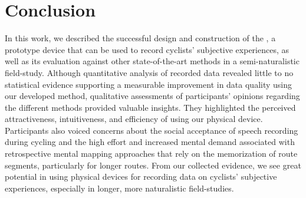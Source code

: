 \section{Conclusion}\label{sec:conclusion}

In this work, we described the successful design and construction of the \likertshift, a prototype device that can be used to record cyclists' subjective experiences, as well as its evaluation against other state-of-the-art methods in a semi-naturalistic field-study.
Although quantitative analysis of recorded data revealed little to no statistical evidence supporting a measurable improvement in data quality using our developed \likertshift method, qualitative assessments of participants' opinions regarding the different methods provided valuable insights.
They highlighted the perceived attractiveness, intuitiveness, and efficiency of using our physical device.
Participants also voiced concerns about the social acceptance of speech recording during cycling and the high effort and increased mental demand associated with retrospective mental mapping approaches that rely on the memorization of route segments, particularly for longer routes.
From our collected evidence, we see great potential in using physical devices for recording data on cyclists' subjective experiences, especially in longer, more naturalistic field-studies.
